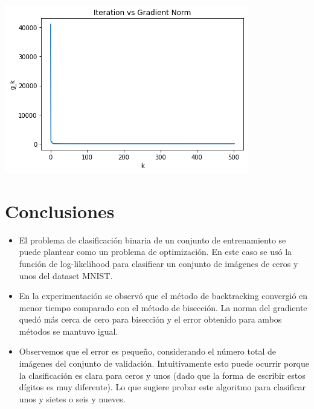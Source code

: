 \documentclass[11pt,letterpaper]{article}
\theoremstyle{definition}
\theoremstyle{definition}
\theoremstyle{definition}
\begin{document}
\begin{center}
\includegraphics[width=0.8\linewidth]{graficas/bic_g}
\end{center}

\section{Conclusiones}
	\begin{itemize}
		\item El problema de clasificación binaria de un conjunto de entrenamiento se puede plantear como un problema de optimización. En este caso se usó la función de log-likelihood para clasificar un conjunto de imágenes de ceros y unos del dataset MNIST. 
		\item En la experimentación se observó que el método de backtracking convergió en menor tiempo comparado con el método de bisección. La norma del gradiente quedó más cerca de cero para bisección y el error obtenido para ambos métodos se mantuvo igual.
		\item Observemos que el error es pequeño, considerando el número total de imágenes del conjunto de validación. Intuitivamente esto puede ocurrir porque la clasificación es clara para ceros y unos (dado que la forma de escribir estos dígitos es muy diferente). Lo que sugiere probar este algoritmo para clasificar unos y sietes o seis y nueves.
	\end{itemize}
\end{document}
